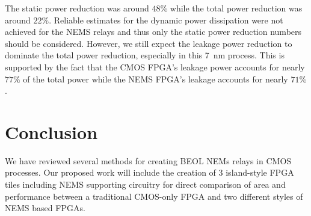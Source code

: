 \documentclass[twoside,twocolumn]{article}
\begin{document}
The static power reduction was around $48\%$ while the total power reduction
was around $22\%$. Reliable estimates for the dynamic power dissipation were 
not achieved for the NEMS relays and thus only the static power reduction numbers 
should be considered. However, we still expect the leakage power reduction to dominate 
the total power reduction, especially in this \SI{7}{\nano\meter} process. This is
supported by the fact that the CMOS FPGA's leakage power accounts for nearly $77\%$ 
of the total power while the NEMS FPGA's leakage accounts for nearly $71\%$.

\section{Conclusion}
We have reviewed several methods for creating BEOL NEMs relays in CMOS processes. 
Our proposed work will include the creation of 3 island-style FPGA tiles including NEMS 
supporting circuitry for direct comparison of area and performance between a traditional 
CMOS-only FPGA and two different styles of NEMS based FPGAs.


\printbibliography

\end{document}

